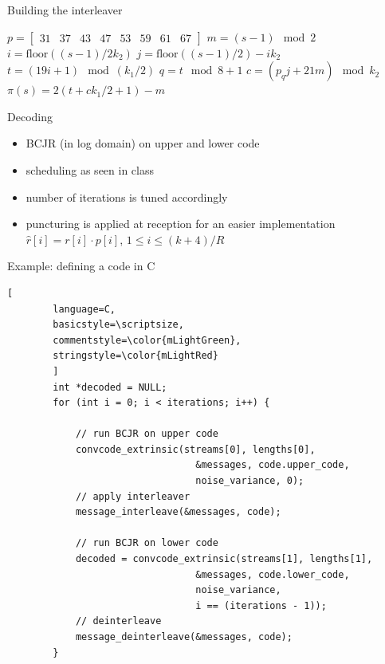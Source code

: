 \documentclass[handout,xcolor={usenames,dvipsnames},11pt]{beamer}
\begin{document}
\begin{frame}{Building the interleaver}
    \begin{algorithmic}
        \State $p = \begin{bmatrix}31 & 37 & 43 & 47 & 53 & 59 & 61 & 67\end{bmatrix}$
            \State $m = (s-1) \mod 2$
            \State $i = \text{floor}\left((s-1)/2k_2\right)$
            \State $j = \text{floor}\left((s-1)/2\right) -i k_2$
            \State $t = (19i + 1) \mod (k_1/2)$
            \State $q = t \mod 8 + 1$
            \State $c = (p_q j + 21m) \mod k_2$
            \State $\pi(s) = 2(t + c k_1/2 +1) - m$
        \EndFor
    \end{algorithmic}
\end{frame}

\begin{frame}[c]{Decoding}
    \begin{itemize}
        \item BCJR (in log domain) on upper and lower code
        \item scheduling as seen in class
        \item number of iterations is tuned accordingly
        \item puncturing is applied at reception for an easier implementation
            $\hat{r}[i] = r[i]\cdot p[i]$, $ 1 \leq i \leq (k+4)/R$
    \end{itemize}
    
\end{frame}
\begin{frame}[c,fragile]{Example: defining a code in C}
    \begin{lstlisting}[
        language=C,
        basicstyle=\scriptsize,
        commentstyle=\color{mLightGreen},
        stringstyle=\color{mLightRed}
        ]
        int *decoded = NULL;
        for (int i = 0; i < iterations; i++) {

            // run BCJR on upper code
            convcode_extrinsic(streams[0], lengths[0], 
                                 &messages, code.upper_code,
                                 noise_variance, 0);
            // apply interleaver
            message_interleave(&messages, code);

            // run BCJR on lower code
            decoded = convcode_extrinsic(streams[1], lengths[1], 
                                 &messages, code.lower_code, 
                                 noise_variance, 
                                 i == (iterations - 1));
            // deinterleave
            message_deinterleave(&messages, code);
        }
    \end{lstlisting}
\end{frame}
\end{document}
